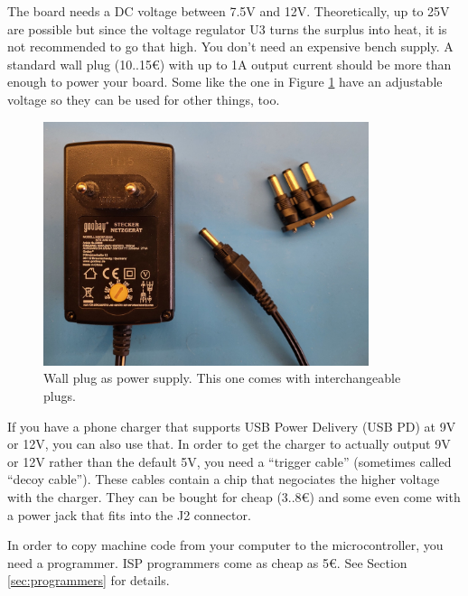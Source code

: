\documentclass{article}
\begin{document}
The board needs a DC voltage between 7.5V and 12V. Theoretically, up to 25V are possible but since the voltage regulator U3 turns the surplus into heat, it is not recommended to go that high. You don't need an expensive bench supply. A standard wall plug (10..15\euro) with up to 1A output current should be more than enough to power your board. Some like the one in Figure \ref{fig:wallPlug} have an adjustable voltage so they can be used for other things, too. 
\begin{figure}[htb]
\centering
\includegraphics[width=0.85\textwidth]{Pictures/WallPlug.jpg}
\caption{Wall plug as power supply. This one comes with interchangeable plugs.}
\label{fig:wallPlug}
\end{figure}

If you have a phone charger that supports USB Power Delivery (USB PD) at 9V or 12V, you can also use that. In order to get the charger to actually output 9V or 12V rather than the default 5V, you need a ``trigger cable'' (sometimes called ``decoy cable''). These cables contain a chip that negociates the higher voltage with the charger. They can be bought for cheap (3..8\euro) and some even come with a power jack that fits into the J2 connector. 

In order to copy machine code from your computer to the microcontroller, you need a programmer. ISP programmers come as cheap as 5\euro . See Section \ref{sec:programmers} for details. 
\end{document}
